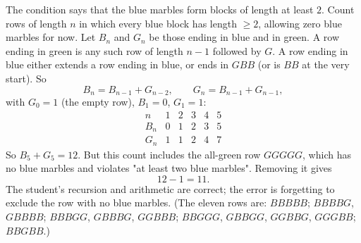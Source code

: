 The condition says that the blue marbles form blocks of length at least $2$. Count rows of length $n$ in which every blue block has length $\ge2$, allowing zero blue marbles for now. Let $B_n$ and $G_n$ be those ending in blue and in green. A row ending in green is any such row of length $n-1$ followed by $G$. A row ending in blue either extends a row ending in blue, or ends in $GBB$ (or is $BB$ at the very start). So
\[B_n=B_{n-1}+G_{n-2},\qquad G_n=B_{n-1}+G_{n-1},\]
with $G_0=1$ (the empty row), $B_1=0$, $G_1=1$:
\[\begin{array}{c|ccccc}n&1&2&3&4&5\\\hline B_n&0&1&2&3&5\\ G_n&1&1&2&4&7\end{array}\]
So $B_5+G_5=12$. But this count includes the all-green row $GGGGG$, which has no blue marbles and violates "at least two blue marbles". Removing it gives
\[12-1=\boxed{11}.\]
The student's recursion and arithmetic are correct; the error is forgetting to exclude the row with no blue marbles. (The eleven rows are: $BBBBB$; $BBBBG$, $GBBBB$; $BBBGG$, $GBBBG$, $GGBBB$; $BBGGG$, $GBBGG$, $GGBBG$, $GGGBB$; $BBGBB$.)
